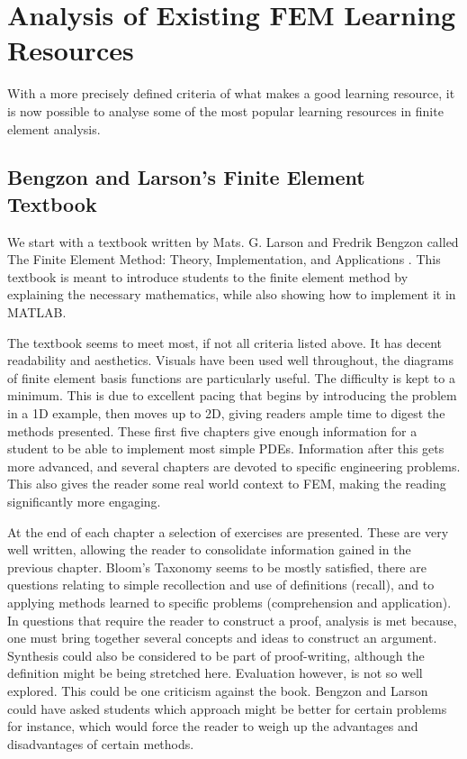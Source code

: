 \section{Analysis of Existing FEM Learning Resources}

With a more precisely defined criteria of what makes a good learning resource, it is now possible to analyse some of the most popular learning resources in finite element analysis.

\subsection{Bengzon and Larson's Finite Element Textbook}

We start with a textbook written by Mats. G. Larson and Fredrik Bengzon called The Finite Element Method: Theory, Implementation, and Applications \cite{bengzon-larson-fem}. This textbook is meant to introduce students to the finite element method by explaining the necessary mathematics, while also showing how to implement it in MATLAB. 

The textbook seems to meet most, if not all criteria listed above. It has decent readability and aesthetics. Visuals have been used well throughout, the diagrams of finite element basis functions are particularly useful. The difficulty is kept to a minimum. This is due to excellent pacing that begins by introducing the problem in a 1D example, then moves up to 2D, giving readers ample time to digest the methods presented. These first five chapters give enough information for a student to be able to implement most simple PDEs. Information after this gets more advanced, and several chapters are devoted to specific engineering problems. This also gives the reader some real world context to FEM, making the reading significantly more engaging.

At the end of each chapter a selection of exercises are presented. These are very well written, allowing the reader to consolidate information gained in the previous chapter. Bloom's Taxonomy seems to be mostly satisfied, there are questions relating to simple recollection and use of definitions (recall), and to applying methods learned to specific problems (comprehension and application). In questions that require the reader to construct a proof, analysis is met because, one must bring together several concepts and ideas to construct an argument. Synthesis could also be considered to be part of proof-writing, although the definition might be being stretched here. Evaluation however, is not so well explored. This could be one criticism against the book. Bengzon and Larson could have asked students which approach might be better for certain problems for instance, which would force the reader to weigh up the advantages and disadvantages of certain methods.

